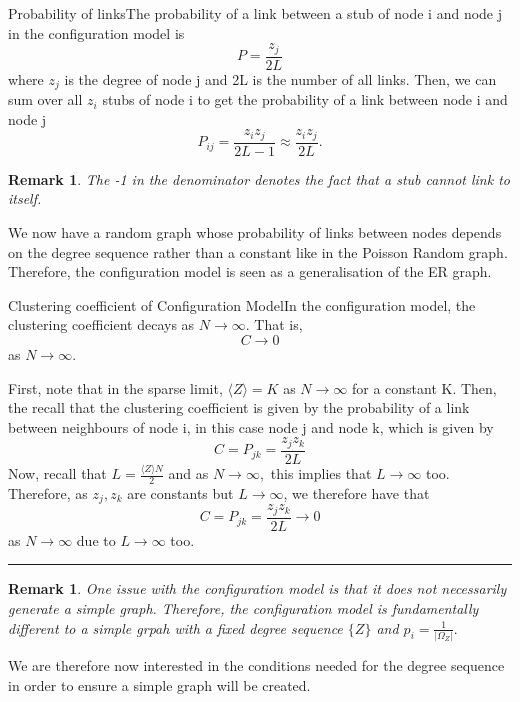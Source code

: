 \documentclass[twoside]{article}
\newtheorem{remark}[theorem]{Remark}
\newenvironment{proof}{{\bf Proof:}}{\hfill\rule{2mm}{2mm}}
\begin{document}
\begin{theorem_exam}{Probability of links}{}The probability of a link between a stub of node i and node j in the configuration model is 
$$
P = \frac{z_j}{2L}
$$
where $z_j$ is the degree of node j and 2L is the number of all links. Then, we can sum over all $z_i$ stubs of node i to get the probability of a link between node i and node j
$$
P_{ij} = \frac{z_iz_j}{2L - 1} \approx \frac{z_iz_j}{2L}.
$$
\end{theorem_exam}
\begin{remark} The -1 in the denominator denotes the fact that a stub cannot link to itself.
\end{remark}


We now have a random graph whose probability of links between nodes depends on the degree sequence rather than a constant like in the Poisson Random graph. Therefore, the configuration model is seen as a generalisation of the ER graph.

\begin{proposition_exam}{Clustering coefficient of Configuration Model}{}In the configuration model, the clustering coefficient decays as $N \rightarrow \infty.$ That is,
$$
C \rightarrow 0
$$
as $N \rightarrow \infty$.
\end{proposition_exam}

\begin{proof} First, note that in the sparse limit, $\langle Z \rangle = K$ as $N \rightarrow \infty$ for a constant K. Then, the recall that the clustering coefficient is given by the probability of a link between neighbours of node i, in this case node j and node k, which is given by 
$$
C = P_{jk} = \frac{z_jz_k}{2L}
$$
Now, recall that $L = \frac{\langle Z \rangle N}{2}$ and as $N \rightarrow \infty,$ this implies that $L \rightarrow \infty$ too. Therefore, as $z_j, z_k$ are constants but $L \rightarrow \infty$, we therefore have that 
$$
C = P_{jk} = \frac{z_jz_k}{2L} \rightarrow 0
$$
as $N \rightarrow \infty$ due to $L \rightarrow \infty$ too. 
\end{proof}

\begin{remark} One issue with the configuration model is that it does not necessarily generate a simple graph. Therefore, the configuration model is fundamentally different to a simple grpah with a fixed degree sequence $\{Z\}$ and $p_i = \frac{1}{|\Omega_Z|}.$
\end{remark}

We are therefore now interested in the conditions needed for the degree sequence in order to ensure a simple graph will be created.
\end{document}
